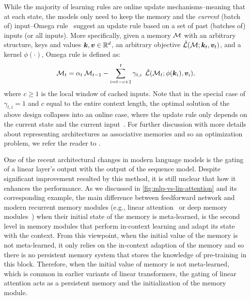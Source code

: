 {While the majority of learning rules are online update mechanisms–meaning that at each state, the models only need to keep the memory and the \emph{current} (batch of) input–Omega rule~\citep{behrouz2025atlas} suggest an update rule based on a set of past (batches of) inputs (or all inputs). More specifically, given a memory $\mathcal{M}$ with an arbitrary structure, keys and values $\boldsymbol{k}, \boldsymbol{v} \in \mathbb{R}^{d}$, an arbitrary objective $\tilde{\mathcal{L}}(\mathcal{M}; \boldsymbol{k}_t, \boldsymbol{v}_t)$, and a kernel $\phi(\cdot)$, Omega rule is defined as:
\begin{align}
    \mathcal{M}_{t} = \alpha_t \: \mathcal{M}_{t-1} - \sum_{i = t-c+1}^{t} \gamma_{t, i} \:\:\tilde{\mathcal{L}}(\mathcal{M}_t; \phi(\boldsymbol{k}_i), \boldsymbol{v}_i),
\end{align}
where $c \geq 1$ is the local window of cached inputs. Note that in the special case of $\gamma_{t, i} = 1$ and $c$ equal to the entire context length, the optimal solution of the above design collapses into an online case, where the update rule only depends on the current state and the current input~\citep{von2023uncovering}. For further discussion with more details about representing architectures as associative memories and so an optimization problem, we refer the reader to \citet{behrouz2025Miras}.  



One of the recent architectural changes in modern language models is the gating of a linear layer's output with the output of the sequence model. Despite significant improvement resulted by this method, it is still unclear that how it enhances the performance. 
As we discussed in \autoref{fig:mlp-vs-lin-attention} and its corresponding example, the main difference between feedforward network and modern recurrent memory modules (e.g., linear attention~\citep{katharopoulos2020transformers} or deep memory modules~\citep{behrouz2024titans}) when their initial state of the memory is meta-learned, is the second level in memory modules that perform in-context learning and adapt its state with the context. From this viewpoint, when the initial value of the memory is not meta-learned, it only relies on the in-context adaption of the memory and so there is no persistent memory system that stores the knowledge of pre-training in this block. Therefore, when the initial value of memory is not meta-learned, which is common in earlier variants of linear transformers, the gating of linear attention acts as a persistent memory and the initialization of the memory module. 









}
